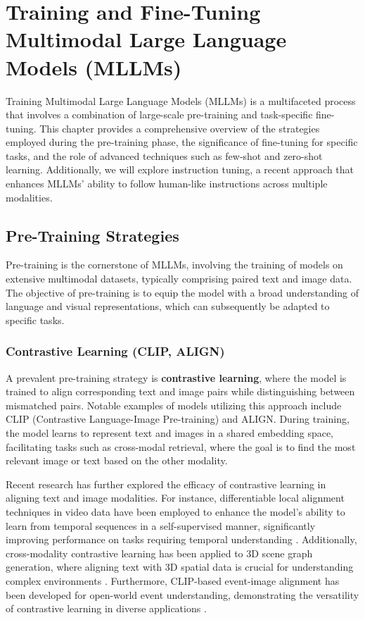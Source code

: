 \chapter{Training and Fine-Tuning Multimodal Large Language Models (MLLMs)}

Training Multimodal Large Language Models (MLLMs) is a multifaceted process that involves a combination of large-scale pre-training and task-specific fine-tuning. This chapter provides a comprehensive overview of the strategies employed during the pre-training phase, the significance of fine-tuning for specific tasks, and the role of advanced techniques such as few-shot and zero-shot learning. Additionally, we will explore instruction tuning, a recent approach that enhances MLLMs' ability to follow human-like instructions across multiple modalities.

\section{Pre-Training Strategies}

Pre-training is the cornerstone of MLLMs, involving the training of models on extensive multimodal datasets, typically comprising paired text and image data. The objective of pre-training is to equip the model with a broad understanding of language and visual representations, which can subsequently be adapted to specific tasks.

\subsection{Contrastive Learning (CLIP, ALIGN)}

A prevalent pre-training strategy is \textbf{contrastive learning}, where the model is trained to align corresponding text and image pairs while distinguishing between mismatched pairs. Notable examples of models utilizing this approach include CLIP (Contrastive Language-Image Pre-training) and ALIGN. During training, the model learns to represent text and images in a shared embedding space, facilitating tasks such as cross-modal retrieval, where the goal is to find the most relevant image or text based on the other modality.

Recent research has further explored the efficacy of contrastive learning in aligning text and image modalities. For instance, differentiable local alignment techniques in video data have been employed to enhance the model's ability to learn from temporal sequences in a self-supervised manner, significantly improving performance on tasks requiring temporal understanding \cite{temporal_alignment_2024}. Additionally, cross-modality contrastive learning has been applied to 3D scene graph generation, where aligning text with 3D spatial data is crucial for understanding complex environments \cite{3d_scene_graph_2024}. Furthermore, CLIP-based event-image alignment has been developed for open-world event understanding, demonstrating the versatility of contrastive learning in diverse applications \cite{event_image_alignment_2024}.

